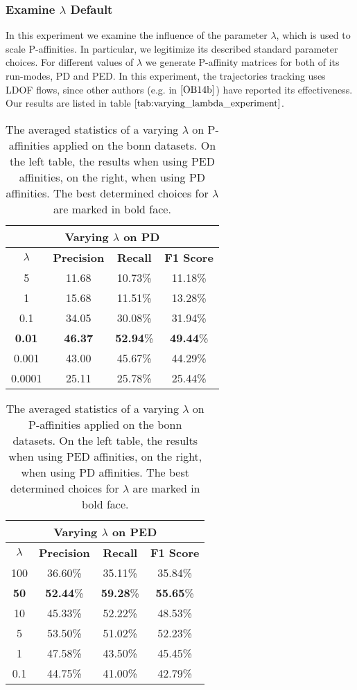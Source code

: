\subsubsection{Examine $\lambda$ Default}
In this experiment we examine the influence of the parameter $\lambda$, which is used to scale P-affinities. In particular, we legitimize its described standard parameter choices. For different values of $\lambda$ we generate P-affinity matrices for both of its run-modes, PD and PED. In this experiment, the trajectories tracking uses LDOF flows, since other authors (e.g. in $\cite{OB14b}$) have reported its effectiveness. Our results are listed in table $\ref{tab:varying_lambda_experiment}$.
\begin{table}[H]
\centering
\setlength\tabcolsep{4pt}
\begin{minipage}{0.48\textwidth}
\centering
\begin{tabular}{|c|c|c|c|}
\hline
\multicolumn{4}{|c|}{Varying $\lambda$ on PD} \\ \hline
$\lambda$ & \textbf{Precision} & \textbf{Recall} & \textbf{F1 Score} \\ \hline
5 & 11.68 & 10.73\% & 11.18\%  \\ \hline
1 & 15.68 & 11.51\% & 13.28\%  \\ \hline
0.1 & 34.05 & 30.08\% & 31.94\%  \\ \hline
\textbf{0.01} & \textbf{46.37} & \textbf{52.94}\% & \textbf{49.44}\%  \\ \hline
0.001 & 43.00 & 45.67\% & 44.29\%  \\ \hline
0.0001 & 25.11 & 25.78\% & 25.44\%  \\ \hline
\end{tabular}
\end{minipage}%
\hfill
\begin{minipage}{0.48\textwidth}
\centering
\begin{tabular}{|c|c|c|c|}
\hline
\multicolumn{4}{|c|}{Varying $\lambda$ on PED}                        \\ \hline
$\lambda$ & \textbf{Precision} & \textbf{Recall} & \textbf{F1 Score} \\ \hline
100 & 36.60\% & 35.11\% & 35.84\%  \\ \hline
\textbf{50} & \textbf{52.44}\% & \textbf{59.28}\% & \textbf{55.65}\%  \\ \hline
10 & 45.33\% & 52.22\% & 48.53\%  \\ \hline
5 & 53.50\% & 51.02\% & 52.23\%  \\ \hline
1 & 47.58\% & 43.50\% & 45.45\%  \\ \hline
0.1 & 44.75\% & 41.00\% & 42.79\%  \\ \hline
\end{tabular}
\end{minipage}
\caption[Experiment Varying $\lambda$]{The averaged statistics of a varying $\lambda$ on P-affinities applied on the bonn datasets. On the left table, the results when using PED affinities, on the right, when using PD affinities. The best determined choices for $\lambda$ are marked in bold face.}
\label{tab:varying_lambda_experiment}
\end{table}
